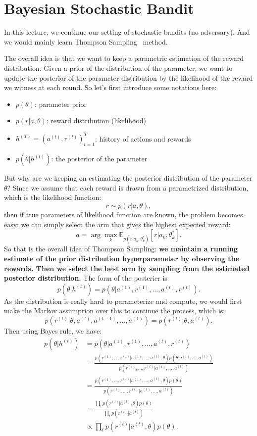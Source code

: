 \documentclass[11pt]{article}
\begin{document}
\section{Bayesian Stochastic Bandit}
In this lecture, we continue our setting of stochastic bandits (no adversary).  And we would mainly learn Thompson Sampling~\cite{thompson1933likelihood} method.

The overall idea is that we want to keep a parametric estimation of the reward distribution. Given a prior of the distribution of the parameter, we want to update the posterior of the parameter distribution by the likelihood of the reward we witness at each round. So let's first introduce some notations here:
\begin{itemize}
    \item $p(\theta)$: parameter prior
    \item $p(r|a,\theta)$: reward distribution (likelihood)
    \item $h^{(T)} = (a^{(t)}, r^{(t)})_{t=1}^T$: history of actions and rewards
    \item $p(\theta|h^{(t)})$: the posterior of the parameter
\end{itemize}
But why are we keeping on estimating the posterior distribution of the parameter $\theta$? Since we assume that each reward is drawn from a parametrized distribution, which is the likelihood function:
\[r \sim p(r|a,\theta),\]
then if true parameters of likelihood function are known, the problem becomes easy: we can simply select the arm that gives the highest expected reward:
\[a = \arg\max_{k} \mathbb{E}_{p(r|a_k, \theta^{\ast}_k)}[r | a_k, \theta^{\ast}_k].\]
So that is the overall idea of Thompson Sampling: 
\textbf{we maintain a running estimate of the prior distribution hyperparameter by observing the rewards. Then we
select the best arm by sampling from the estimated posterior distribution.} The form of the posterier is 
\[p(\theta | h^{(t)}) = p(\theta| a^{(1)}, r^{(1)}, \dots, a^{(t)}, r^{(t)}).\]
As the distribution is really hard to parameterize and compute, we would first make the Markov assumption over this to continue the process, which is:
\[p(r^{(t)}|\theta,a^{(t)}, a^{(t-1)}, \dots, a^{(1)}) = p(r^{(t)}|\theta,a^{(t)}).\]
Then using Bayes rule, we have:
\begin{align*}
    p(\theta | h^{(t)}) &= p(\theta| a^{(1)}, r^{(1)}, \dots, a^{(t)}, r^{(t)}) \\
    &= \frac{p(r^{(1)}, \dots, r^{(t)} | a^{(1)}, \dots, a^{(t)}, \theta) p(\theta | a^{(1)}, \dots, a^{(t)})}{ p(r^{(1)}, \dots, r^{(t)} | a^{(1)}, \dots, a^{(t)})} \\
    &= \frac{p(r^{(1)}, \dots, r^{(t)} | a^{(1)}, \dots, a^{(t)}, \theta) p(\theta)}{ p(r^{(1)}, \dots, r^{(t)} | a^{(1)}, \dots, a^{(t)})} \\
    &= \frac{\prod_{t} p(r^{(t)}| a^{(t)}, \theta) p(\theta) }{\prod_{t} p(r^{(t)}| a^{(t)})}\\
    &\propto \prod_{t} p(r^{(t)}| a^{(t)}, \theta) p(\theta).
\end{align*}
\end{document}
